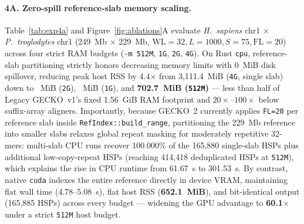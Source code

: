 \documentclass[pdflatex,sn-vancouver,Numbered]{sn-jnl}
\newcommand{\eFourACpuFiveTwelveW}{301.53} \newcommand{\eFourACpuFiveTwelveR}{702.7}   \newcommand{\eFourACpuFiveTwelveF}{414,418} \newcommand{\eFourASpFiveTwelve}{60.1$\times$}
\newcommand{\eFourACpuFourGW}{61.67}       \newcommand{\eFourACpuFourGR}{3,111.4}      \newcommand{\eFourACpuFourGF}{165,880}      \newcommand{\eFourASpFourG}{12.9$\times$}
\newcommand{\eFourACudaTwoGW}{5.08}        \newcommand{\eFourACudaTwoGR}{652.1}
\newcommand{\eFourACudaFourGW}{4.78}       \newcommand{\eFourACudaFourGR}{652.1}
\begin{document}
\paragraph{4A. Zero-spill reference-slab memory scaling.}
Table~\ref{tab:exp4a} and Figure~\ref{fig:ablations}A evaluate \textit{H.~sapiens} chr1 $\times$ \textit{P.~troglodytes} chr1 (249~Mb $\times$ 229~Mb, $\text{WL}=32, L=1000, S=75, \text{FL}=20$) across four strict RAM budgets (\texttt{-m 512M}, \texttt{1G}, \texttt{2G}, \texttt{4G}). On Rust \texttt{cpu}, reference-slab partitioning strictly honors decreasing memory limits with 0~MiB disk spillover, reducing peak host RSS by 4.4$\times$ from \eFourACpuFourGR{}~MiB (\texttt{4G}, single slab) down to \eFourACpuTwoGR{}~MiB (\texttt{2G}), \eFourACpuOneGR{}~MiB (\texttt{1G}), and \textbf{\eFourACpuFiveTwelveR{}~MiB (\texttt{512M})} --- less than half of Legacy GECKO~v1's fixed 1.56~GiB RAM footprint and $20\times$--$100\times$ below suffix-array aligners. Importantly, because GECKO~2 currently applies \texttt{FL=20} per reference slab inside \texttt{RefIndex::build\_range}, partitioning the 229~Mb reference into smaller slabs relaxes global repeat masking for moderately repetitive 32-mers: multi-slab CPU runs recover 100.000\% of the \eFourACpuFourGF{} single-slab HSPs plus additional low-copy-repeat HSPs (reaching \eFourACpuFiveTwelveF{} deduplicated HSPs at \texttt{512M}), which explains the rise in CPU runtime from \eFourACpuFourGW{}~s to \eFourACpuFiveTwelveW{}~s. By contrast, native \texttt{cuda} indexes the entire reference directly in device VRAM, maintaining flat wall time (\eFourACudaFourGW{}--\eFourACudaTwoGW{}~s), flat host RSS (\textbf{\eFourACudaFourGR{}~MiB}), and bit-identical output (165,885 HSPs) across every budget --- widening the GPU advantage to \textbf{\eFourASpFiveTwelve{}} under a strict \texttt{512M} host budget.
\end{document}
